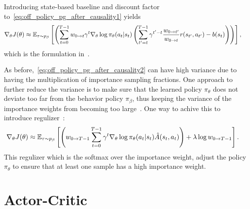 \documentclass{article}
\begin{document}
Introducing state-based baseline and discount factor to~\eqref{eq:off_policy_pg_after_causality1} yields
\begin{align}
\nabla_\theta J(\theta) &\approx {\mathbb E}_{\tau \sim p_\beta} \left[\left(\sum_{t=0}^{T-1} w_{0\to t}\gamma^t \nabla_\theta \log \pi_\theta(a_t\vert s_t)  \left(\sum_{t^\prime=t}^{T-1} \gamma^{t^\prime - t}\frac{w_{{0} \to {t^\prime}}}{w_{{0} \to {t}}} r(s_{t^\prime}, a_{t^\prime}) - b(s_t)\right)\right) \right],\label{eq:off_policy_pg_after_causality2}
\end{align}
which is the formulation in~\cite{precup2000eligibility}.

As before,~\eqref{eq:off_policy_pg_after_causality2} can have high variance due to having the multiplication of importance sampling fractions.
One approach to further reduce the variance is to make sure that the learned policy $\pi_\theta$ does not deviate too far from the behavior policy $\pi_\beta$, thus keeping the variance of the importance weights from becoming too large~\cite{levine2020offline}.
One way to achive this to introduce regulizer~\cite{levine2013guided,levine2020offline}:
\begin{align*}
\nabla_\theta J(\theta) &\approx {\mathbb E}_{\tau \sim p_\beta} \left[\left( w_{{0} \to {T-1}} \sum_{t=0}^{T-1}\gamma^t \nabla_\theta \log \pi_\theta (a_t\vert s_t) \hat A(s_t,a_t)\right) + \lambda \log w_{{0} \to {T-1}}\right].
\end{align*}
This regulizer which is the softmax over the importance weight, adjust the policy $\pi_\theta$ to ensure that at least one sample has a high importance weight.



\newpage
\section{Actor-Critic}
\end{document}
